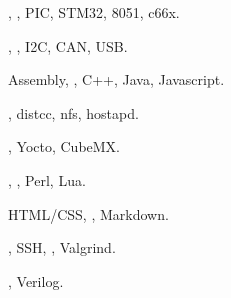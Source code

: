 
    {, , PIC, STM32, 8051, c66x.}
    {}{}{}{}

    {, , I2C, CAN, USB.}
    {}{}{}{}

    {Assembly, , C++, Java, Javascript.}
    {}{}{}{}

    {, distcc, nfs, hostapd.}
    {}{}{}{}

    {, Yocto, CubeMX.}
    {}{}{}{}


    {, , Perl, Lua.}
    {}{}{}{}

    {HTML/CSS, \texthl{\LaTeX}, Markdown.}
    {}{}{}{}

    {, SSH, , Valgrind.}
    {}{}{}{}


    {, Verilog.}
    {}{}{}{}
